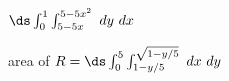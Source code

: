 {$\ds \int_{0}^{1}\int_{5-5x}^{5-5x^2} \ dy \ dx$
}
{\noindent \begin{minipage}{\linewidth}
\end{minipage}

area of $R = \ds \int_0^5\int_{1-y/5}^{\sqrt{1-y/5}} \ dx \ dy$
}

